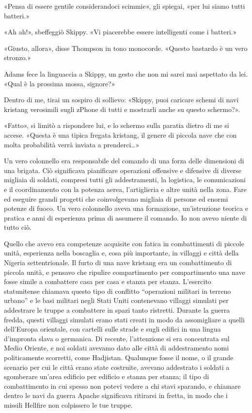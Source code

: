 «Pensa di essere gentile considerandoci scimmie», gli spiegai, «per lui
siamo tutti batteri.»

«Ah ah!», sbeffeggiò Skippy. «Vi piacerebbe essere intelligenti come i
batteri.»

«Giusto, allora», disse Thompson in tono monocorde. «Questo bastardo è
un vero stronzo.»

Adams fece la linguaccia a Skippy, un gesto che non mi sarei mai
aspettato da lei. «Qual è la prossima mossa, signore?»

Dentro di me, tirai un sospiro di sollievo: «Skippy, puoi caricare
schemi di navi kristang verosimili sugli zPhone di tutti e mostrarli
anche su questo schermo?».

«Fatto», si limitò a rispondere lui, e lo schermo sulla paratia dietro
di me si accese. «Questa è una tipica fregata kristang, il genere di
piccola nave che con molta probabilità verrà inviata a prenderci\ldots»

Un vero colonnello era responsabile del comando di una forza delle
dimensioni di una brigata. Ciò significava pianificare operazioni
offensive e difensive di diverse migliaia di soldati, compresi tutti gli
addestramenti, la logistica, le comunicazioni e il coordinamento con la
potenza aerea, l'artiglieria e altre unità nella zona. Fare ed eseguire
grandi progetti che coinvolgevano migliaia di persone ed enormi potenze
di fuoco. Un vero colonnello aveva una formazione, un'istruzione teorica
e pratica e anni di esperienza prima di assumere il comando. Io non
avevo niente di tutto ciò.

Quello che avevo era competenze acquisite con fatica in combattimenti di
piccole unità, esperienza nella boscaglia e, cosa più importante, in
villaggi e città della Nigeria settentrionale. Il furto di una nave
kristang era un combattimento di piccola unità, e pensavo che ripulire
compartimento per compartimento una nave fosse simile a combattere casa
per casa e stanza per stanza. L'esercito statunitense chiamava questo
tipo di conflitto ``operazioni militari in terreno urbano'' e le basi
militari negli Stati Uniti contenevano villaggi simulati per addestrare
le truppe a combattere in spazi tanto ristretti. Durante la guerra
fredda, questi villaggi simulati erano stati creati in modo da
assomigliare a quelli dell'Europa orientale, con cartelli sulle strade e
sugli edifici in una lingua d'impronta slava o germanica. Di recente,
l'attenzione si era concentrata sul Medio Oriente, e noi soldati avevamo
dato alle città di addestramento nomi politicamente scorretti, come
Hadjistan. Qualunque fosse il nome, o il grande scenario per cui le
città erano state costruite, avevano addestrato i soldati a sgomberare
un'area edificio per edificio e stanza per stanza; il tipo di
combattimento in cui spesso non potevi vedere a chi stavi sparando, e
chiamare dentro le navi da guerra Apache significava ritirarsi in
fretta, in modo che i missili Hellfire non colpissero le tue truppe.

